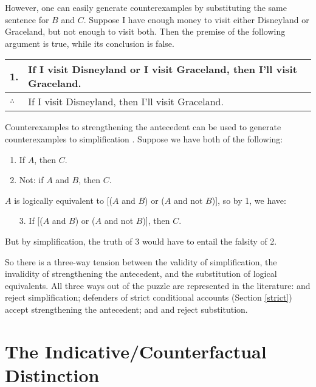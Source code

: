 However, one can easily generate counterexamples by substituting the same sentence for $B$ and $C$.  Suppose I have enough money to visit either Disneyland or Graceland, but not enough to visit both.  Then the premise of the following argument is true, while its conclusion is false.\smallskip\\
\begin{tabular}{ll}
1. & If I visit Disneyland or I visit Graceland, then I'll visit Graceland.\\
\hline
$\therefore$ & If I visit Disneyland, then I'll visit Graceland.
\end{tabular}

\medskip

Counterexamples to strengthening the antecedent can be used to generate counterexamples to simplification \citep{Fine1975-FINCN-2}.  Suppose we have both of the following:
\begin{enumerate}
\item If $A$, then $C$.
\item Not: if $A$ and $B$, then $C$.
\end{enumerate}
$A$ is logically equivalent to [($A$ and $B$) or ($A$ and not $B$)], so by 1, we have:
\begin{enumerate}
\item[3.] If [($A$ and $B$) or ($A$ and not $B$)], then $C$.
\end{enumerate}
But by simplification, the truth of 3 would have to entail the falsity of 2.

So there is a three-way tension between the validity of simplification, the invalidity of strengthening the antecedent, and the substitution of logical equivalents. All three ways out of the puzzle are represented in the literature: \citet{Loewer1976-LOECWD} and \citet{Mckay1977-MCKCWD} reject simplification; defenders of strict conditional accounts (Section \ref{strict}) accept strengthening the antecedent; and \citet{Nute1975-NUTCAT-2} and \citet{Alonso-Ovalle2009-ALOCCA} reject substitution.

\section{The Indicative/Counterfactual Distinction}
\label{indicative-counterfactual}

